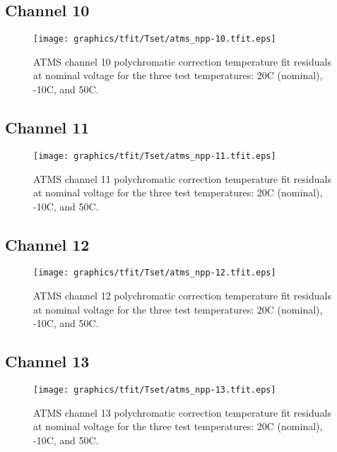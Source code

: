 \subsection{Channel 10}
\begin{figure}[H]
  \label{fig:Tset.ch10_tfit}
  \centering
  \texttt{[image: graphics/tfit/Tset/atms\_npp-10.tfit.eps]}
  \caption{ATMS channel 10 polychromatic correction temperature fit residuals at nominal voltage for the three test temperatures: 20\textdegree{}C (nominal), -10\textdegree{}C, and 50\textdegree{}C.}
\end{figure}

\subsection{Channel 11}
\begin{figure}[H]
  \label{fig:Tset.ch11_tfit}
  \centering
  \texttt{[image: graphics/tfit/Tset/atms\_npp-11.tfit.eps]}
  \caption{ATMS channel 11 polychromatic correction temperature fit residuals at nominal voltage for the three test temperatures: 20\textdegree{}C (nominal), -10\textdegree{}C, and 50\textdegree{}C.}
\end{figure}

\subsection{Channel 12}
\begin{figure}[H]
  \label{fig:Tset.ch12_tfit}
  \centering
  \texttt{[image: graphics/tfit/Tset/atms\_npp-12.tfit.eps]}
  \caption{ATMS channel 12 polychromatic correction temperature fit residuals at nominal voltage for the three test temperatures: 20\textdegree{}C (nominal), -10\textdegree{}C, and 50\textdegree{}C.}
\end{figure}

\subsection{Channel 13}
\begin{figure}[H]
  \label{fig:Tset.ch13_tfit}
  \centering
  \texttt{[image: graphics/tfit/Tset/atms\_npp-13.tfit.eps]}
  \caption{ATMS channel 13 polychromatic correction temperature fit residuals at nominal voltage for the three test temperatures: 20\textdegree{}C (nominal), -10\textdegree{}C, and 50\textdegree{}C.}
\end{figure}

